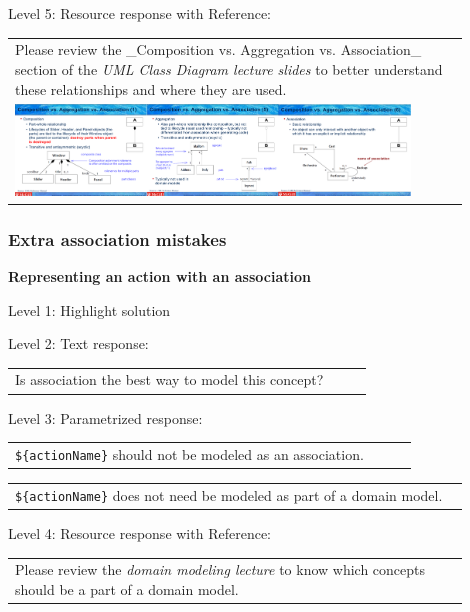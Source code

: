 \noindent Level 5: Resource response with Reference: \medskip

\begin{tabular}{|p{0.9\linewidth}}
Please review the _Composition vs. Aggregation vs. Association_ section of 
the \textit{UML Class Diagram lecture slides} to 
better understand these relationships and where they are used.

\\
\includegraphics[width=0.9\textwidth]{images/composition_aggregation_association.png}
\end{tabular} \medskip


\subsubsection{Extra association mistakes}

\noindent \textbf{Representing an action with an association} \medskip

\noindent Level 1: Highlight solution  \medskip

\noindent Level 2: Text response: \medskip

\begin{tabular}{|p{0.9\linewidth}}
Is association the best way to model this concept?
\end{tabular} \medskip

\noindent Level 3: Parametrized response: \medskip

\begin{tabular}{|p{0.9\linewidth}}
\verb|${actionName}| should not be modeled as an association.
\end{tabular} \medskip

\begin{tabular}{|p{0.9\linewidth}}
\verb|${actionName}| does not need be modeled as part of a domain model.
\end{tabular} \medskip

\noindent Level 4: Resource response with Reference: \medskip

\begin{tabular}{|p{0.9\linewidth}}
Please review the \textit{domain modeling lecture} to know which concepts should be a part of a domain model.
\end{tabular} \medskip


